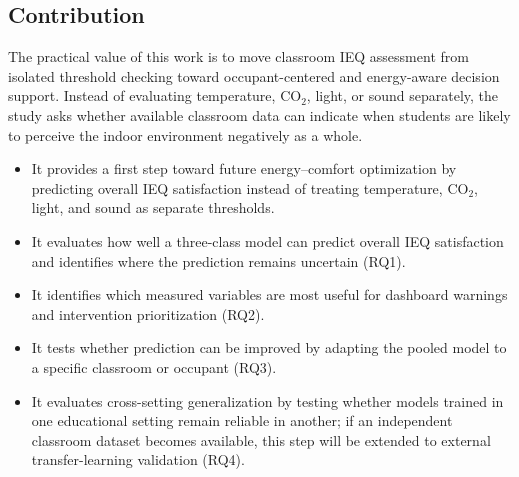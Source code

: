 ﻿\documentclass[11pt]{article}
\newcommand{\Reviewed}[1]{\begingroup\color{black}#1\endgroup}
\begin{document}
\Reviewed{
\subsection{Contribution}

The practical value of this work is to move classroom IEQ assessment from isolated threshold checking toward occupant-centered and energy-aware decision support. Instead of evaluating temperature, CO$_2$, light, or sound separately, the study asks whether available classroom data can indicate when students are likely to perceive the indoor environment negatively as a whole.

\begin{itemize}
    \item It provides a first step toward future energy--comfort optimization by predicting overall IEQ satisfaction instead of treating temperature, CO$_2$, light, and sound as separate thresholds.
    \item It evaluates how well a three-class model can predict overall IEQ satisfaction and identifies where the prediction remains uncertain (RQ1).
    \item It identifies which measured variables are most useful for dashboard warnings and intervention prioritization (RQ2).
    \item It tests whether prediction can be improved by adapting the pooled model to a specific classroom or occupant (RQ3).
    \item It evaluates cross-setting generalization by testing whether models trained in one educational setting remain reliable in another; if an independent classroom dataset becomes available, this step will be extended to external transfer-learning validation (RQ4).
\end{itemize}}
\end{document}
